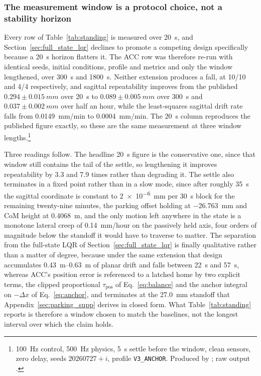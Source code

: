 \documentclass[a4paper,fleqn]{cas-dc}
\begin{document}
\subsubsection{The measurement window is a protocol choice, not a stability horizon}
\label{sec:longhorizon}

Every row of Table~\ref{tab:standing} is measured over \SI{20}{s}, and
Section~\ref{sec:full_state_lqr} declines to promote a competing design
specifically because a \SI{20}{s} horizon flatters it. The ACC row was therefore
re-run with identical seeds, initial conditions, profile and metrics and only the
window lengthened, over \SI{300}{s} and \SI{1800}{s}. Neither extension produces
a fall, at \num{10}/\num{10} and \num{4}/\num{4} respectively, and sagittal
repeatability improves from the published $0.294{\pm}\SI{0.015}{mm}$ over
\SI{20}{s} to $0.089{\pm}\SI{0.005}{mm}$ over \SI{300}{s} and
$0.037{\pm}\SI{0.002}{mm}$ over half an hour, while the least-squares sagittal
drift rate falls from \SI{0.0149}{mm/min} to \SI{0.0004}{mm/min}. The
\SI{20}{s} column reproduces the published figure exactly, so these are the same
measurement at three window lengths.\footnote{\SI{100}{Hz} control,
\SI{500}{Hz} physics, \SI{5}{s} settle before the window, clean sensors, zero
delay, seeds $20260727{+}i$, profile \texttt{V3\_ANCHOR}. Produced by
; raw output
.}

Three readings follow. The headline \SI{20}{s} figure is the conservative one,
since that window still contains the tail of the settle, so lengthening it
improves repeatability by \num{3.3} and \num{7.9} times rather than degrading it.
The settle also terminates in a fixed
point rather than in a slow mode, since after roughly \SI{35}{s} the sagittal
coordinate is constant to \SI{2e-6}{mm} per \SI{30}{s} block for the remaining
twenty-nine minutes, the parking offset holding at \SI{-26.763}{mm} and CoM
height at \SI{0.4068}{m}, and the only motion left anywhere in the state is a
monotone lateral creep of \SI{0.14}{mm/hour} on the passively held axis, four
orders of magnitude below the standoff it would have to traverse to matter. The
separation from the full-state LQR of Section~\ref{sec:full_state_lqr} is finally
qualitative rather than a matter of degree, because under the same extension that
design accumulates
\SIrange{0.43}{0.63}{m} of planar drift and falls between \SI{22}{s} and
\SI{57}{s}, whereas ACC's position error is referenced to a
latched home by two explicit terms, the clipped proportional
$\tau_{\text{pos}}$ of Eq.~\eqref{eq:balance} and the anchor integral on
$-\Delta x$ of Eq.~\eqref{eq:anchor}, and terminates at the
\SI{27.0}{mm} standoff that Appendix~\ref{sec:parking_supp} derives in closed
form. What Table~\ref{tab:standing} reports is therefore a window chosen to
match the baselines, not the longest interval over which the claim holds.
\end{document}
